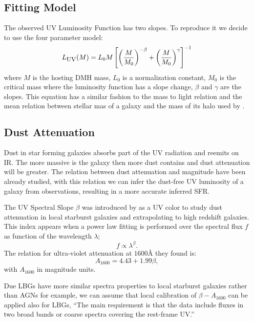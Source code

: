 \subsection{Fitting Model}

The observed UV Luminosity Function has two slopes. To reproduce it we decide to use the
 four parameter model:
  \begin{equation}\label{eqn:luminosity}
  L_{\textrm{\small{UV}}} (M) = L_{0} M \left[ \left( \frac{M}{M_0}\right)^{-\beta} 
		   + \left( \frac{M}{M_0}\right)^{\gamma} 
               \right]^{-1}
  \end{equation}
where $M$ is the hosting DMH mass, $L_{0}$ is a normalization constant, $M_0$
is the critical mass where the luminosity function has a slope change, 
$\beta$ and $\gamma$ are the slopes. This equation has a similar fashion to the
mass to light relation \citep{vandenbosch03} and the mean relation between
stellar mas of a galaxy and the mass of its halo used by \citet{moster10}.


\subsection{Dust Attenuation}
 
Dust in star forming galaxies absorbs part of the UV radiation and reemits on IR. The more 
massive is the galaxy then more dust contains and dust attenuation will be greater. The 
relation between dust attenuation and magnitude have been already studied, with this relation 
we can infer the dust-free UV luminosity of a galaxy from observations, resulting in  a more 
accurate inferred SFR.

The UV Spectral Slope $\beta$ was introduced by \citet{meurer99} as a UV color to 
study dust attenuation in local starburst galaxies and extrapolating to high redshift galaxies. 
This index appears when a power law fitting is performed over the spectral flux $f$ 
as function of the wavelength $\lambda$;
\[ f \propto \lambda^\beta.\]
The relation for ultra-violet attenuation at $1600 \textrm{\AA}$ they found is:
\begin{equation}
A_{1600} = 4.43 + 1.99 \beta,
\end{equation}
with $A_{1600}$ in magnitude units. 

Due LBGs have more similar spectra properties to local starburst galaxies rather than AGNs 
for example, we can assume that local calibration of $\beta-A_{1600}$ can be applied also 
for LBGs,
``The main requirement is that the data include fluxes in two broad bands or coarse spectra 
covering the rest-frame UV.''


